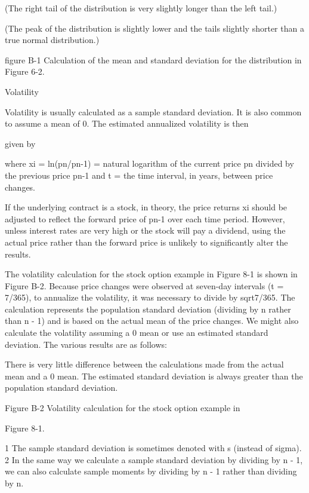 (The right tail of the distribution is very slightly longer than the left tail.)\par
(The peak of the distribution is slightly lower and the tails slightly shorter than a true normal distribution.)\par
figure B-1 Calculation of the mean and standard deviation for the distribution in Figure 6-2.\par
\noindent Volatility\par
Volatility is usually calculated as a sample standard deviation. It is also common to assume a mean of 0. The estimated annualized volatility is then\par

\noindent given by\par
where xi = ln(pn/pn-1) = natural logarithm of the current price pn divided by the previous price pn-1 and t = the time interval, in years, between price changes.\par
If the underlying contract is a stock, in theory, the price returns xi should be adjusted to reflect the forward price of pn-1 over each time period. However, unless interest rates are very high or the stock will pay a dividend, using the actual price rather than the forward price is unlikely to significantly alter the results.\par
The volatility calculation for the stock option example in Figure 8-1 is shown in Figure B-2. Because price changes were observed at seven-day intervals (t = 7/365), to annualize the volatility, it was necessary to divide by sqrt7/365. The calculation represents the population standard deviation (dividing by n rather than n - 1) and is based on the actual mean of the price changes. We might also calculate the volatility assuming a 0 mean or use an estimated standard deviation. The various results are as follows:\par
There is very little difference between the calculations made from the actual mean and a 0 mean. The estimated standard deviation is always greater than the population standard deviation.\par

Figure B-2 Volatility calculation for the stock option example in\par
Figure 8-1.\par

1 The sample standard deviation is sometimes denoted with s (instead of sigma). 2 In the same way we calculate a sample standard deviation by dividing by n - 1, we can also calculate sample moments by dividing by n - 1 rather than dividing by n.\par


